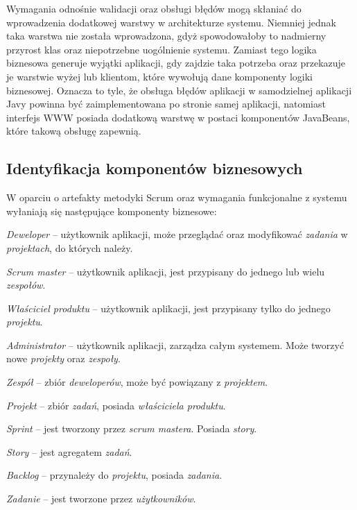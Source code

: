 Wymagania odnośnie walidacji oraz obsługi błędów mogą skłaniać do wprowadzenia dodatkowej warstwy w architekturze systemu. Niemniej jednak taka warstwa nie została wprowadzona, gdyż spowodowałoby to nadmierny przyrost klas oraz niepotrzebne uogólnienie systemu. Zamiast tego logika biznesowa generuje wyjątki aplikacji, gdy zajdzie taka potrzeba oraz przekazuje je warstwie wyżej lub klientom, które wywołują dane komponenty logiki biznesowej. Oznacza to tyle, że obsługa błędów aplikacji w samodzielnej aplikacji Javy powinna być zaimplementowana po stronie samej aplikacji, natomiast interfejs WWW posiada dodatkową warstwę w postaci komponentów JavaBeans, które takową obsługę zapewnią. 

\subsection{Identyfikacja komponentów biznesowych}
W oparciu o artefakty metodyki Scrum oraz wymagania funkcjonalne z systemu wyłaniają się następujące komponenty biznesowe:

\textit{Deweloper} -- użytkownik aplikacji, może przeglądać oraz modyfikować \textit{zadania} w \textit{projektach}, do których należy.

\textit{Scrum master} -- użytkownik aplikacji, jest przypisany do jednego lub wielu \textit{zespołów}.

\textit{Właściciel produktu} -- użytkownik aplikacji, jest przypisany tylko do jednego \textit{projektu}.

\textit{Administrator} -- użytkownik aplikacji, zarządza całym systemem. Może tworzyć nowe \textit{projekty} oraz \textit{zespoły}.

\textit{Zespół} -- zbiór \textit{deweloperów}, może być powiązany z \textit{projektem}.

\textit{Projekt} -- zbiór \textit{zadań}, posiada \textit{właściciela produktu}.

\textit{Sprint} -- jest tworzony przez  \textit{scrum mastera}. Posiada \textit{story}.

\textit{Story} -- jest agregatem \textit{zadań}.

\textit{Backlog} -- przynależy do \textit{projektu}, posiada \textit{zadania}.

\textit{Zadanie} -- jest tworzone przez \textit{użytkowników}.


